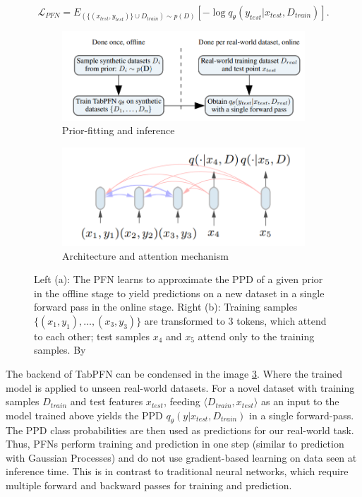 \documentclass[../main.tex]{subfiles}
\begin{document}
\begin{equation}
    \mathcal{L}_{\textit{PFN}} = E_{(\{(x_{test}, y_{test})\} \cup D_{train}) \sim p(D)} [-\log q_{\theta}(y_{test}|x_{test},D_{train})].
    \label{eq:lpfn}
\end{equation}

\begin{figure}
    \begin{subfigure}{.5\textwidth}
        \centering
        \includegraphics[width=.8\linewidth]{Figure/tabpfn_prior-fitting.png}
        \caption{Prior-fitting and inference}
        \label{fig:pfn_usage}
    \end{subfigure}
    \begin{subfigure}{.5\textwidth}
        \centering
        \includegraphics[width=.8\linewidth]{Figure/tabpfn_baysian_nodes.png}
        \caption{Architecture and attention mechanism}
        \label{fig:transformer_visualization}
    \end{subfigure}
    \caption{Left (a): The PFN learns to approximate the PPD of a given prior in the offline stage to yield predictions on a new dataset in a single forward pass in the online stage. Right (b): Training samples $\{(x_1,y_1), \dots, (x_3,y_3)\}$ are transformed to $3$ tokens, which attend to each other; test samples $x_4$ and $x_5$ attend only to the training samples. By \citeauthor{tabpfn}}
    \label{fig:pfn_overview}
\end{figure}

The backend of TabPFN can be condensed in the image \ref{fig:pfn_overview}.
Where the trained model is applied to unseen real-world datasets.
For a novel dataset with training samples $D_{train}$ and test features $x_{test}$, feeding $\langle{}D_{train},x_{test}\rangle$ as an input to the model trained above yields the PPD $q_{\theta}(y|x_{test},D_{train})$ in a single forward-pass.
The PPD class probabilities are then used as predictions for our real-world task.
Thus, PFNs perform training and prediction in one step (similar to prediction with Gaussian Processes) and do not use gradient-based learning on data seen at inference time.
This is in contrast to traditional neural networks, which require multiple forward and backward passes for training and prediction.
\end{document}
